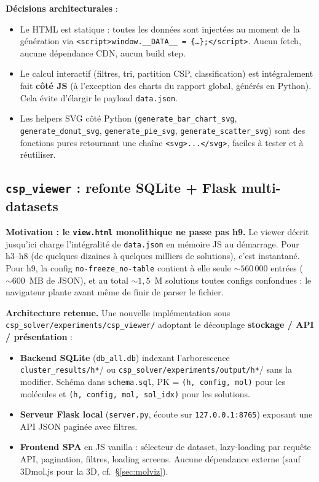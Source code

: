\textbf{Décisions architecturales} :
\begin{itemize}
  \item Le HTML est statique : toutes les données sont injectées au moment de la
    génération via \texttt{<script>window.\_\_DATA\_\_ = \{\ldots\};</script>}. Aucun fetch,
    aucune dépendance CDN, aucun build step.
  \item Le calcul interactif (filtres, tri, partition CSP, classification) est intégralement
    fait \textbf{côté JS} (à l'exception des charts du rapport global, générés en Python).
    Cela évite d'élargir le payload \texttt{data.json}.
  \item Les helpers SVG côté Python (\texttt{generate\_bar\_chart\_svg},
    \texttt{generate\_donut\_svg}, \texttt{generate\_pie\_svg},
    \texttt{generate\_scatter\_svg}) sont des fonctions pures retournant une chaîne
    \texttt{<svg>...</svg>}, faciles à tester et à réutiliser.
\end{itemize}

\subsection{\texttt{csp\_viewer} : refonte SQLite + Flask multi-datasets}


\textbf{Motivation : le \texttt{view.html} monolithique ne passe pas h9.} Le viewer
décrit jusqu'ici charge l'intégralité de \texttt{data.json} en mémoire JS au démarrage.
Pour h3--h8 (de quelques dizaines à quelques milliers de solutions), c'est instantané.
Pour h9, la config \texttt{no-freeze\_no-table} contient à elle seule
${\sim}560\,000$ entrées (${\sim}600$~MB de JSON), et au total ${\sim}1{,}5$~M solutions
toutes configs confondues : le navigateur plante avant même de finir de parser le
fichier.

\textbf{Architecture retenue.} Une nouvelle implémentation sous
\texttt{csp\_solver/experiments/csp\_viewer/} adoptant le découplage
\textbf{stockage / API / présentation} :

\begin{itemize}
  \item \textbf{Backend SQLite} (\texttt{db\_all.db}) indexant l'arborescence
    \texttt{cluster\_results/h*}/ ou \texttt{csp\_solver/experiments/output/h*}/
    sans la modifier. Schéma dans \texttt{schema.sql}, PK = \texttt{(h, config, mol)}
    pour les molécules et \texttt{(h, config, mol, sol\_idx)} pour les solutions.
  \item \textbf{Serveur Flask local} (\texttt{server.py}, écoute sur
    \texttt{127.0.0.1:8765}) exposant une API JSON paginée avec filtres.
  \item \textbf{Frontend SPA} en JS vanilla : sélecteur de dataset, lazy-loading par
    requête API, pagination, filtres, loading screens. Aucune dépendance externe
    (sauf 3Dmol.js pour la 3D, cf.~\S\ref{sec:molviz}).
\end{itemize}

